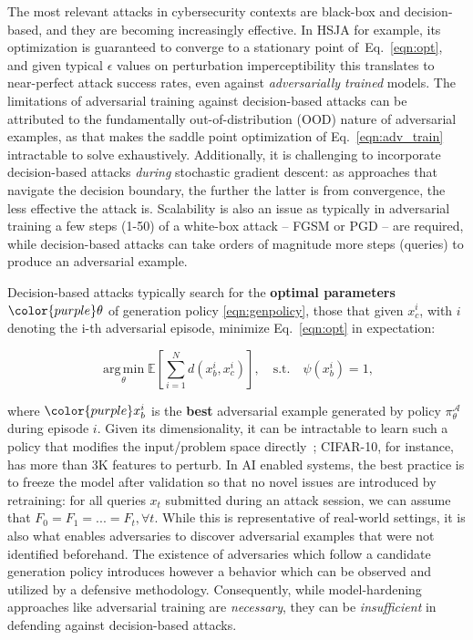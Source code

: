 The most relevant attacks in cybersecurity contexts are black-box and decision-based, and they are becoming increasingly effective.
In HSJA for example, its optimization is guaranteed to converge to a stationary point of~Eq.~\eqref{eqn:opt}, and given typical $\epsilon$ values on perturbation imperceptibility this translates to near-perfect attack success rates, even against \textit{adversarially trained} models.
The limitations of adversarial training against decision-based attacks can be attributed to the fundamentally out-of-distribution (OOD) nature of adversarial examples, as that makes the saddle point optimization of Eq.~\eqref{eqn:adv_train} intractable to solve exhaustively.
Additionally, it is challenging to incorporate decision-based attacks \textit{during} stochastic gradient descent: as approaches that navigate the decision boundary, the further the latter is from convergence, the less effective the attack is.
Scalability is also an issue as typically in adversarial training a few steps (1-50) of a white-box attack -- FGSM or PGD -- are required, while decision-based attacks can take orders of magnitude more steps (queries) to produce an adversarial example.

Decision-based attacks typically search for the \textbf{optimal parameters} $\color{purple}\theta$ of generation policy \eqref{eqn:genpolicy}, those that given $x^{i}_{c}$, with $i$ denoting the i-th adversarial episode, minimize Eq.~\eqref{eqn:opt} in expectation:

\begin{equation}
    \operatorname*{arg\,min}_{\theta} \mathbb{E}[\sum_{i=1}^{N}d(x^i_b,x^i_c)], \quad \text{s.t.} \quad \psi(x^i_b) = 1,
\label{eqn:rew}
\end{equation}

\noindent where $\color{purple}x^i_b$ is the \textbf{best} adversarial example generated by policy $\pi_\theta^{\mathcal{A}}$ during episode $i$.
Given its dimensionality, it can be intractable to learn such a policy that modifies the input/problem space directly~\cite{pierazzi2020intriguing}; CIFAR-10, for instance, has more than 3K features to perturb.
In AI enabled systems, the best practice is to freeze the model after validation so that no novel issues are introduced by retraining: for all queries $x_t$ submitted during an attack session, we can assume that $F_0 = F_1 = ... = F_t, \forall t$.
While this is representative of real-world settings, it is also what enables adversaries to discover adversarial examples that were not identified beforehand.
The existence of adversaries which follow a candidate generation policy introduces however a behavior which can be observed and utilized by a defensive methodology.
Consequently, while model-hardening approaches like adversarial training are \emph{necessary}, they can be \emph{insufficient} in defending against decision-based attacks.

